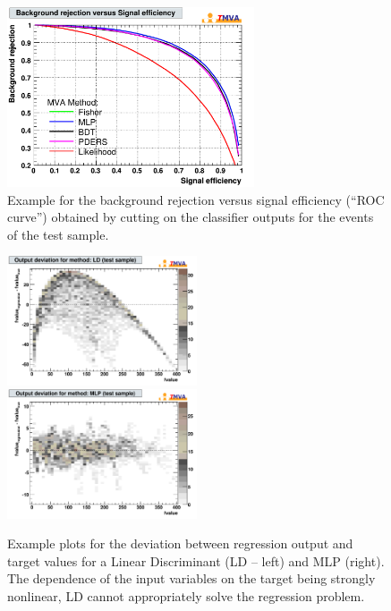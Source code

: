 \begin{figure}[t]
\begin{center}
  \includegraphics[width=0.65\textwidth]{plots/rejBvsS}
\end{center}
\vspace{-0.5cm}
\caption[.]{Example for the background rejection versus signal efficiency (``ROC curve'') obtained
            by cutting on the classifier outputs for the events of the test sample.
             }
\label{fig:usingtmva:rejBvsS}
\end{figure}
\begin{figure}[t]
\begin{center}
  \includegraphics[width=0.50\textwidth]{plots/deviation_LD_target_test_c0}
  \hspace{-0.3cm}
  \includegraphics[width=0.50\textwidth]{plots/deviation_MLP_target_test_c0}
  \vspace{0.2cm}
\end{center}
\vspace{-1.2cm}
\caption[.]{Example plots for the deviation between regression output and target values
            for a Linear Discriminant (LD -- left) and MLP (right). The dependence of the
            input variables on the target being strongly nonlinear, LD cannot appropriately
            solve the regression problem. }
\label{fig:usingtmva:deviation}
\end{figure}



